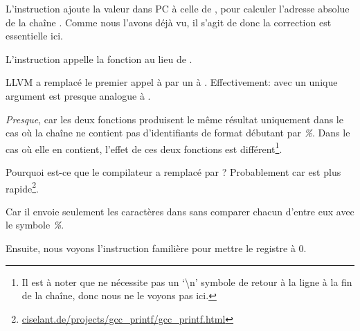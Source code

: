 L'instruction  ajoute la valeur dans \ac{PC} à celle de
, pour calculer l'adresse absolue de la chaîne .
Comme nous l'avons déjà vu, il s'agit de \q{\PICcode} donc la correction
est essentielle ici.

L'instruction  appelle la fonction \puts au lieu de \printf.

\label{puts}

LLVM a remplacé le premier appel à \printf par un à \puts.
Effectivement: \printf avec un unique argument est presque analogue à \puts.

\emph{Presque}, car les deux fonctions produisent le même résultat uniquement dans
le cas où la chaîne ne contient pas d'identifiants de format débutant par \emph{\%}.
Dans le cas où elle en contient, l'effet de ces deux fonctions est différent\footnote{Il
est à noter que \puts ne nécessite pas un `\textbackslash{}n'
symbole de retour à la ligne à la fin de la chaîne, donc nous ne le voyons pas ici.}.

Pourquoi est-ce que le compilateur a remplacé \printf par \puts? Probablement car
\puts est plus
rapide\footnote{\href{http://www.ciselant.de/projects/gcc_printf/gcc_printf.html}{ciselant.de/projects/gcc\_printf/gcc\_printf.html}}. 

Car il envoie seulement les caractères dans 
sans comparer chacun d'entre eux avec le symbole \emph{\%}.

Ensuite, nous voyons l'instruction familière  pour mettre le
registre  à 0.

